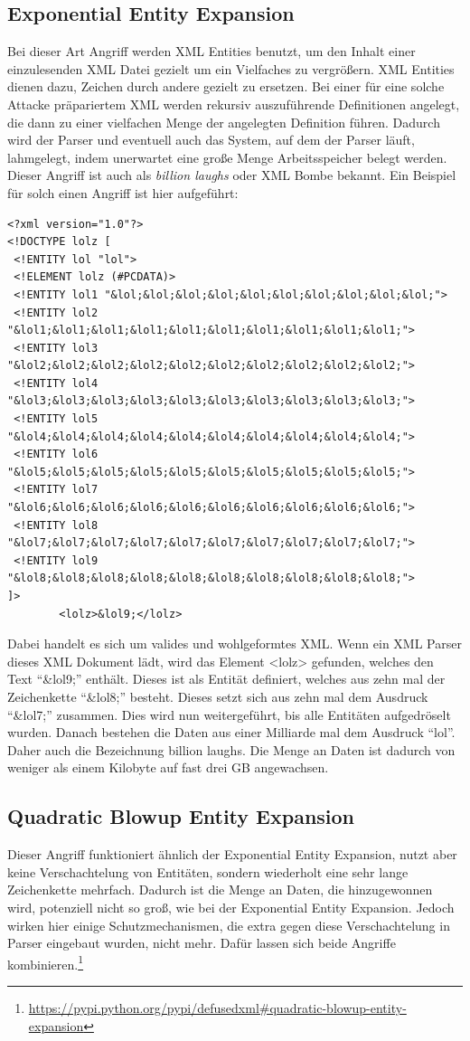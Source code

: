 		\subsection{Exponential Entity Expansion}
		Bei dieser Art Angriff werden XML Entities benutzt, um den Inhalt einer
		einzulesenden XML Datei gezielt um ein Vielfaches zu vergrößern. XML Entities
		dienen dazu, Zeichen durch andere gezielt zu ersetzen. Bei einer
		für eine solche Attacke präpariertem XML werden rekursiv auszuführende
		Definitionen angelegt, die dann zu einer vielfachen Menge der angelegten
		Definition führen. Dadurch wird der Parser und eventuell auch das System, auf
		dem der Parser läuft, lahmgelegt, indem unerwartet eine große Menge
		Arbeitsspeicher belegt werden. Dieser Angriff ist auch als \textit{billion laughs} oder XML
		Bombe bekannt.\cite{Sul09} Ein Beispiel für solch einen Angriff ist hier aufgeführt:
		\begin{lstlisting}
<?xml version="1.0"?>
<!DOCTYPE lolz [
 <!ENTITY lol "lol">
 <!ELEMENT lolz (#PCDATA)>
 <!ENTITY lol1 "&lol;&lol;&lol;&lol;&lol;&lol;&lol;&lol;&lol;&lol;">
 <!ENTITY lol2 "&lol1;&lol1;&lol1;&lol1;&lol1;&lol1;&lol1;&lol1;&lol1;&lol1;">
 <!ENTITY lol3 "&lol2;&lol2;&lol2;&lol2;&lol2;&lol2;&lol2;&lol2;&lol2;&lol2;">
 <!ENTITY lol4 "&lol3;&lol3;&lol3;&lol3;&lol3;&lol3;&lol3;&lol3;&lol3;&lol3;">
 <!ENTITY lol5 "&lol4;&lol4;&lol4;&lol4;&lol4;&lol4;&lol4;&lol4;&lol4;&lol4;">
 <!ENTITY lol6 "&lol5;&lol5;&lol5;&lol5;&lol5;&lol5;&lol5;&lol5;&lol5;&lol5;">
 <!ENTITY lol7 "&lol6;&lol6;&lol6;&lol6;&lol6;&lol6;&lol6;&lol6;&lol6;&lol6;">
 <!ENTITY lol8 "&lol7;&lol7;&lol7;&lol7;&lol7;&lol7;&lol7;&lol7;&lol7;&lol7;">
 <!ENTITY lol9 "&lol8;&lol8;&lol8;&lol8;&lol8;&lol8;&lol8;&lol8;&lol8;&lol8;">
]>
		<lolz>&lol9;</lolz>
		\end{lstlisting}
		Dabei handelt es sich um valides und wohlgeformtes XML. Wenn ein XML Parser
		dieses XML Dokument lädt, wird das Element <lolz> gefunden, welches den Text
		“&lol9;” enthält. Dieses ist als Entität definiert, welches aus zehn mal der
		Zeichenkette “&lol8;” besteht. Dieses setzt sich aus zehn mal
		dem Ausdruck “&lol7;”  zusammen. Dies wird nun weitergeführt, bis alle
		Entitäten aufgedröselt wurden. Danach bestehen die Daten aus einer Milliarde
		mal dem Ausdruck "`lol"'. Daher auch die Bezeichnung billion laughs. Die Menge an
		Daten ist dadurch von weniger als einem Kilobyte auf fast drei GB
		angewachsen.\cite{Sul09}
		
		\subsection{Quadratic Blowup Entity Expansion}
		Dieser Angriff funktioniert ähnlich der Exponential Entity Expansion, nutzt
		aber keine Verschachtelung von Entitäten, sondern wiederholt eine sehr lange
		Zeichenkette mehrfach. Dadurch ist die Menge an Daten, die hinzugewonnen wird,
		potenziell nicht so groß, wie bei der Exponential Entity Expansion. Jedoch
		wirken hier einige Schutzmechanismen, die extra gegen diese Verschachtelung in
		Parser eingebaut wurden, nicht mehr. Dafür lassen sich beide Angriffe
		kombinieren.\footnote{\url{https://pypi.python.org/pypi/defusedxml#quadratic-blowup-entity-expansion}}
		
